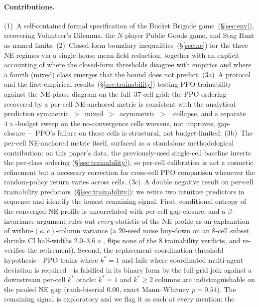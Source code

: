 \documentclass{anvil-paper}
\begin{document}
\paragraph{Contributions.} (1)~A self-contained formal specification of the
Bucket Brigade game~(\S\ref{sec:env}), recovering Volunteer's Dilemma, the
$N$-player Public Goods game, and Stag Hunt as named limits.
(2)~Closed-form boundary inequalities~(\S\ref{sec:ne}) for the three NE
regimes via a single-house mean-field reduction, together with an explicit
accounting of where the closed-form thresholds disagree with empirics and
where a fourth (\textsf{mixed}) class emerges that the bound does not
predict. (3a)~A protocol and the first empirical
results~(\S\ref{sec:trainability}) testing PPO trainability against the
NE phase diagram on the full~$37$-cell grid: the PPO ordering recovered
by a per-cell NE-anchored metric is consistent with the analytical
prediction
\textsf{symmetric}~$>$~\textsf{mixed}~$>$~\textsf{asymmetric}~$>$~%
\textsf{collapse}, and a separate~$4{\times}$-budget sweep on the
no-convergence cells worsens, not improves, gap-closure~--~PPO's
failure on those cells is structural, not budget-limited.
(3b)~The per-cell NE-anchored metric itself, surfaced as a standalone
methodological contribution: on this paper's data, the previously-used
single-cell baseline inverts the per-class ordering (\S\ref{sec:trainability}),
so per-cell calibration is not a cosmetic refinement but a necessary
correction for cross-cell PPO comparison whenever the random-policy
return varies across cells.
(3c)~A double negative result on per-cell trainability
predictors~(\S\ref{sec:trainability}): we retire two intuitive
predictors in sequence and identify the honest remaining signal.
First, conditional entropy of the
converged NE profile is uncorrelated with per-cell gap closure, and a
$\beta$-invariance argument rules out \emph{every} statistic of the NE
profile as an explanation of within-$(\kappa,c)$-column variance (a
$20$-seed noise buy-down on an $8$-cell subset shrinks CI half-widths
$2.0$--$3.6{\times}$, flips none of the $8$ trainability verdicts, and
re-verifies the retirement). Second, the replacement
coordination-threshold hypothesis---PPO trains where $k^{*}{=}1$ and
fails where coordinated multi-agent deviation is required---is
falsified in its binary form by the full-grid join against a
downstream per-cell $k^{*}$ oracle: $k^{*}{=}1$ and $k^{*}{\geq}2$
columns are indistinguishable on the pooled NE gap (rank-biserial
$0.00$, exact Mann--Whitney $p{=}0.54$). The remaining signal is
exploratory and we flag it as such at every mention: the
\end{document}
